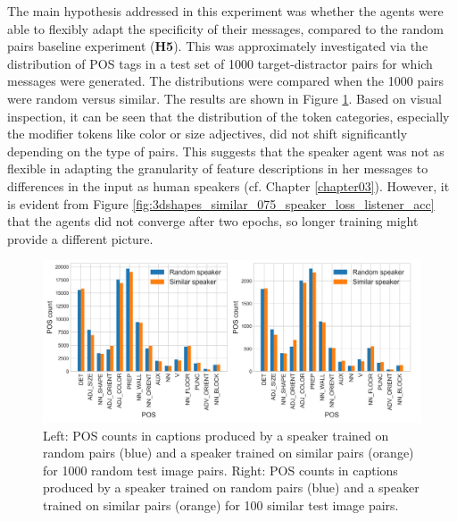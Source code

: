 The main hypothesis addressed in this experiment was whether the agents were able to flexibly adapt the specificity of their messages, compared to the random pairs baseline experiment (\textbf{H5}). This was approximately investigated via the distribution of POS tags in a test set of 1000 target-distractor pairs for which messages were generated. The distributions were compared when the 1000 pairs were random versus similar. The results are shown in Figure \ref{fig:3dshapes_pos}. Based on visual inspection, it can be seen that the distribution of the token categories, especially the modifier tokens like color or size adjectives, did not shift significantly depending on the type of pairs. This suggests that the speaker agent was not as flexible in adapting the granularity of feature descriptions in her messages to differences in the input as human speakers (cf. Chapter \ref{chapter03}). However, it is evident from Figure \ref{fig:3dshapes_similar_075_speaker_loss_listener_acc} that the agents did not converge after two epochs, so longer training might provide a different picture.

\begin{figure}[h]
	\centering
	\includegraphics[width=\linewidth]{images/3dshapes_random_vs_similar_POS_counts.png}
	\caption{Left: POS counts in captions produced by a speaker trained on random pairs (blue) and a speaker trained on similar pairs (orange) for 1000 random test image pairs. Right: POS counts in captions produced by a speaker trained on random pairs (blue) and a speaker trained on similar pairs (orange) for 100 similar test image pairs. }
	\label{fig:3dshapes_pos}
\end{figure}

